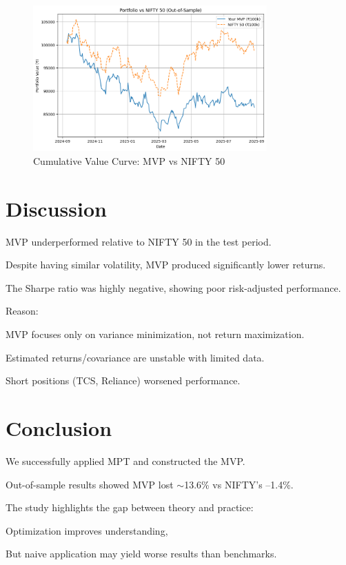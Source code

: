 \documentclass[12pt]{article}
\begin{document}
\begin{figure}[H]
    \centering
    \includegraphics[width=0.8\textwidth]{4.png}
    \caption{Cumulative Value Curve: MVP vs NIFTY 50}
    \label{fig:cumulative}
\end{figure}

\section{Discussion}

MVP underperformed relative to NIFTY 50 in the test period.

Despite having similar volatility, MVP produced significantly lower returns.

The Sharpe ratio was highly negative, showing poor risk-adjusted performance.

Reason:

MVP focuses only on variance minimization, not return maximization.

Estimated returns/covariance are unstable with limited data.

Short positions (TCS, Reliance) worsened performance.

\section{Conclusion}

We successfully applied MPT and constructed the MVP.

Out-of-sample results showed MVP lost $\sim$13.6\% vs NIFTY's –1.4\%.

The study highlights the gap between theory and practice:

Optimization improves understanding,

But naive application may yield worse results than benchmarks.
\end{document}
